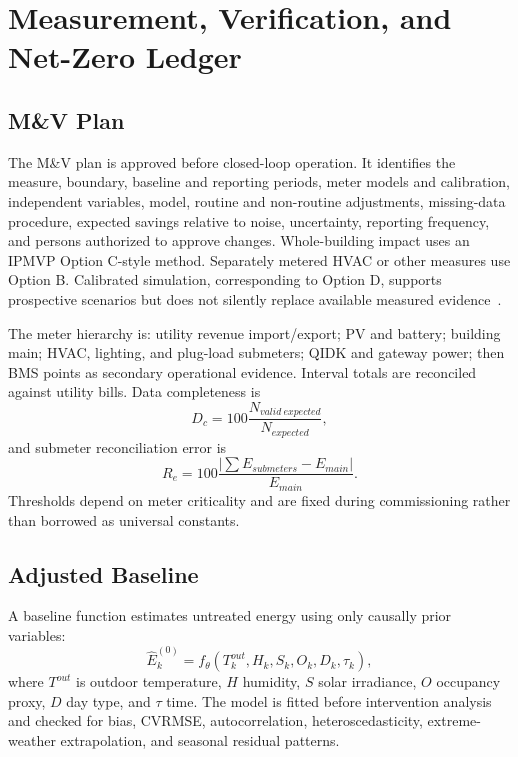 \section{Measurement, Verification, and Net-Zero Ledger}

\subsection{M\&V Plan}

The M\&V plan is approved before closed-loop operation. It identifies the measure, boundary, baseline and reporting periods, meter models and calibration, independent variables, model, routine and non-routine adjustments, missing-data procedure, expected savings relative to noise, uncertainty, reporting frequency, and persons authorized to approve changes. Whole-building impact uses an IPMVP Option C-style method. Separately metered HVAC or other measures use Option B. Calibrated simulation, corresponding to Option D, supports prospective scenarios but does not silently replace available measured evidence~\cite{ipmvp2022}.

The meter hierarchy is: utility revenue import/export; PV and battery; building main; HVAC, lighting, and plug-load submeters; QIDK and gateway power; then BMS points as secondary operational evidence. Interval totals are reconciled against utility bills. Data completeness is
\begin{equation}
	D_c=100\frac{N_{valid\ expected}}{N_{expected}},
\end{equation}
and submeter reconciliation error is
\begin{equation}
	R_e=100\frac{|\sum E_{submeters}-E_{main}|}{E_{main}}.
\end{equation}
Thresholds depend on meter criticality and are fixed during commissioning rather than borrowed as universal constants.

\subsection{Adjusted Baseline}

A baseline function estimates untreated energy using only causally prior variables:
\begin{equation}
	\hat E_k^{(0)}=f_\theta(T_k^{out},H_k,S_k,O_k,D_k,\tau_k),
\end{equation}
where $T^{out}$ is outdoor temperature, $H$ humidity, $S$ solar irradiance, $O$ occupancy proxy, $D$ day type, and $\tau$ time. The model is fitted before intervention analysis and checked for bias, CVRMSE, autocorrelation, heteroscedasticity, extreme-weather extrapolation, and seasonal residual patterns.

